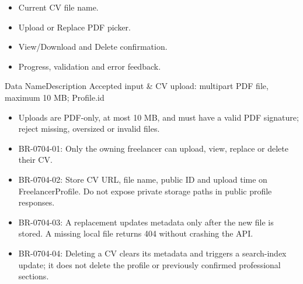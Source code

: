 \begin{itemize}[leftmargin=1.6em,topsep=3pt,itemsep=2pt,parsep=0pt,label=$\bullet$]
    \item Current CV file name.
    \item Upload or Replace PDF picker.
    \item View/Download and Delete confirmation.
    \item Progress, validation and error feedback.
\end{itemize}


\begin{specdatatable}{Data Name}{Description}
Accepted input & CV upload: multipart PDF file, maximum 10 MB; Profile.id\\ \hline
\end{specdatatable}

\begin{itemize}[leftmargin=1.6em,topsep=3pt,itemsep=2pt,parsep=0pt,label=$\bullet$]
    \item Uploads are PDF-only, at most 10 MB, and must have a valid PDF signature; reject missing, oversized or invalid files.
\end{itemize}

\begin{itemize}[leftmargin=1.6em,topsep=3pt,itemsep=2pt,parsep=0pt,label=$\bullet$]\brrulelist
    \item BR-0704-01: Only the owning freelancer can upload, view, replace or delete their CV.
    \item BR-0704-02: Store CV URL, file name, public ID and upload time on FreelancerProfile. Do not expose private storage paths in public profile responses.
    \item BR-0704-03: A replacement updates metadata only after the new file is stored. A missing local file returns 404 without crashing the API.
    \item BR-0704-04: Deleting a CV clears its metadata and triggers a search-index update; it does not delete the profile or previously confirmed professional sections.
\end{itemize}

